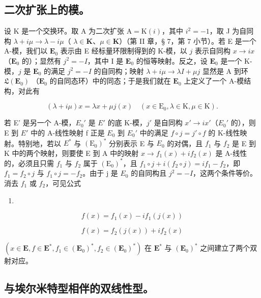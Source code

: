 \subsection{二次扩张上的模。}

设 K 是一个交换环。取 A 为二次扩张 \(\mathrm{A} = \mathrm{K}(i)\)，其中 \(i^{2} = -1\)，取 J 为自同构 \(\lambda + i\mu \to \lambda - i\mu\)（ \(\lambda \in \mathbf{K}\)、\(\mu \in \mathbf{K}\)）（第 II 章，§ 7，第 7 小节）。若 E 是一个 A-模，我们以 \(\mathbf{E}_0\) 表示由 E 经标量环限制得到的 K-模，以 \(j\) 表示自同构 \(x \to ix\)（\(\mathbf{E}_0\) 的）；显然有 \(j^2 = -I\)，其中 I 是 \(\mathbf{E}_0\) 的恒等映射。反之，设 \(\mathbf{E}_0\) 是一个 K-模，\(j\) 是 \(\mathbf{E}_0\) 的满足 \(j^2 = -I\) 的自同构；映射 \(\lambda + i\mu \to \lambda I + \mu j\) 显然是 A 到环 \(\mathfrak{L}(\mathbf{E}_0)\) （\(\mathbf{E}_0\) 的自同态环）中的同态；于是我们就在 \(\mathbf{E}_0\) 上定义了一个 A-模结构，对此有

\[
(\lambda + i \mu) x = \lambda x + \mu j (x) \quad (x \in \mathrm{E} _ {0}, \lambda \in \mathrm{K}, \mu \in \mathrm{K}).\tag{2}
\]

若 E' 是另一个 A-模，\(E_{0}'\) 是 \(E'\) 的底 K-模，\(j'\) 是自同构 \(x' \rightarrow ix'\)（\(E_{0}'\) 的），则 E 到 \(E'\) 中的 A-线性映射 f 正是 \(E_{0}\) 到 \(E_{0}'\) 中的满足 \(f \circ j = j' \circ f\) 的 K-线性映射。特别地，若以 \(E^{*}\) 与 \((\mathrm{E}_{0})^{*}\) 分别表示 E 与 \(E_{0}\) 的对偶，且 \(f_{1}\) 与 \(f_{2}\) 是 E 到 K 中的两个映射，则要使 E 到 A 中的映射 \(x \to f_{1}(x) + if_{2}(x)\) 是 A-线性的，必须且只需 \(f_{1}\) 与 \(f_{2}\) 属于 \((\mathrm{E}_{0})^{*}\)，且 \(f_{1} \circ j + i(f_{2} \circ j) = if_{1} - f_{2}\)，即 \(f_{1} = f_{2} \circ j\) 与 \(f_{1} \circ j = -f_{2}\)。由于 j 是 \(E_{0}\) 的自同构且 \(j^{2} = -I\)，这两个条件等价。消去 \(f_{1}\) 或 \(f_{2}\)，可见公式

\begin{enumerate}
\def\labelenumi{(\arabic{enumi})}
\setcounter{enumi}{2}
\tightlist
\item
\end{enumerate}

\[
f (x) = f _ {1} (x) - i f _ {1} (j (x))\tag{4}
\]

\[
f (x) = f _ {2} (j (x)) + i f _ {2} (x)
\]

\((x \in \mathbf{E}, f \in \mathbf{E}^{*}, f_{1} \in (\mathbf{E}_{0})^{*}, f_{2} \in (\mathbf{E}_{0})^{*})\) 在 \(\mathbf{E}^{*}\) 与 \((\mathbf{E}_{0})^{*}\) 之间建立了两个双射对应。

\subsection{与埃尔米特型相伴的双线性型。}

